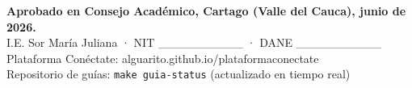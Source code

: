 \documentclass[12pt, a4paper]{article}
\begin{document}
\vspace{2.5cm}

\begin{center}
\begin{tcolorbox}[
  enhanced,
  colback=vinoClaro,
  colframe=vinoInst,
  boxrule=1pt,
  arc=8pt,
  width=0.80\linewidth,
  halign=center
]
\centering
{\small\textbf{Aprobado en Consejo Académico, Cartago (Valle del Cauca), junio de 2026.}}\\[0.3cm]
{\small I.E. Sor María Juliana · NIT \_\_\_\_\_\_\_\_\_\_ · DANE \_\_\_\_\_\_\_\_\_\_}\\[0.2cm]
{\small Plataforma Conéctate: alguarito.github.io/plataformaconectate}\\
{\small Repositorio de guías: \texttt{make guia-status} (actualizado en tiempo real)}
\end{tcolorbox}
\end{center}
\end{document}
